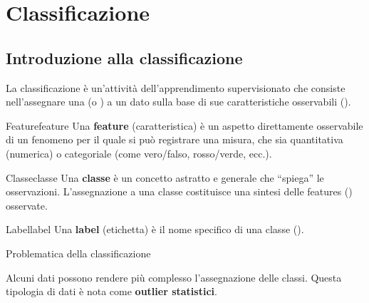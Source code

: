 
\chapter{Classificazione}

\section{Introduzione alla classificazione}

La classificazione è un'attività dell'apprendimento supervisionato che
consiste nell'assegnare una  (o ) a un dato
sulla base di sue caratteristiche osservabili ().

\begin{definizione}{Feature}{feature}
Una \textbf{feature} (caratteristica) è un aspetto direttamente
osservabile di un fenomeno per il quale si può registrare una
misura, che sia quantitativa (numerica) o categoriale
(come vero/falso, rosso/verde, ecc.).
\end{definizione}

\begin{definizione}{Classe}{classe}
Una \textbf{classe} è un concetto astratto
e generale che ``spiega'' le osservazioni. L'assegnazione
a una classe costituisce una sintesi delle features ()
osservate.
\end{definizione}

\begin{definizione}{Label}{label}
Una \textbf{label} (etichetta) è il nome specifico di una classe
().
\end{definizione}

\begin{nota}{Problematica della classificazione}{}

    Alcuni dati possono rendere più complesso l'assegnazione delle classi.
    Questa tipologia di dati è nota come \textbf{outlier statistici}.

\end{nota}

